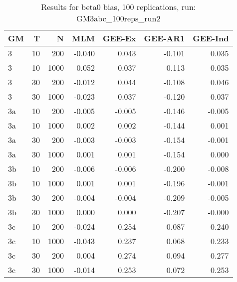 \begin{table}[ht]
\centering
\begin{tabular}{lrrrrrr}
  \hline
GM & T & N & MLM & GEE-Ex & GEE-AR1 & GEE-Ind \\ 
  \hline
3 & 10 & 200 & -0.040 & 0.043 & -0.101 & 0.035 \\ 
  3 & 10 & 1000 & -0.052 & 0.037 & -0.113 & 0.035 \\ 
  3 & 30 & 200 & -0.012 & 0.044 & -0.108 & 0.046 \\ 
  3 & 30 & 1000 & -0.023 & 0.037 & -0.120 & 0.037 \\ 
  3a & 10 & 200 & -0.005 & -0.005 & -0.146 & -0.005 \\ 
  3a & 10 & 1000 & 0.002 & 0.002 & -0.144 & 0.001 \\ 
   \hline
3a & 30 & 200 & -0.003 & -0.003 & -0.154 & -0.001 \\ 
  3a & 30 & 1000 & 0.001 & 0.001 & -0.154 & 0.000 \\ 
  3b & 10 & 200 & -0.006 & -0.006 & -0.200 & -0.008 \\ 
  3b & 10 & 1000 & 0.001 & 0.001 & -0.196 & -0.001 \\ 
  3b & 30 & 200 & -0.004 & -0.004 & -0.209 & -0.005 \\ 
  3b & 30 & 1000 & 0.000 & 0.000 & -0.207 & -0.000 \\ 
   \hline
3c & 10 & 200 & -0.024 & 0.254 & 0.087 & 0.240 \\ 
  3c & 10 & 1000 & -0.043 & 0.237 & 0.068 & 0.233 \\ 
  3c & 30 & 200 & 0.004 & 0.274 & 0.094 & 0.277 \\ 
  3c & 30 & 1000 & -0.014 & 0.253 & 0.072 & 0.253 \\ 
  \end{tabular}
\caption{Results for beta0 bias, 100 replications, run: GM3abc_100reps_run2} 
\label{tab:beta0_bias}
\end{table}
